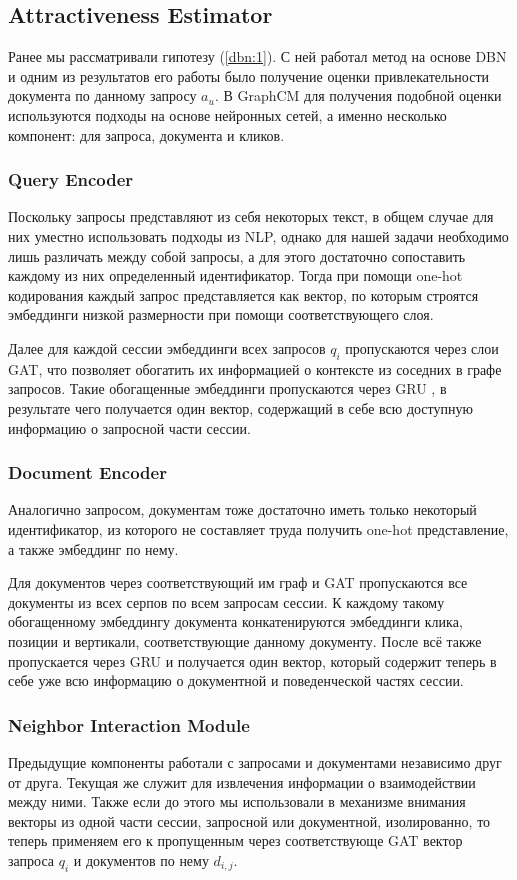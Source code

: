 \documentclass[diploma]{nanolab2015}
\begin{document}
\subsection{Attractiveness Estimator}
Ранее мы рассматривали гипотезу (\ref{dbn:1}). С ней работал метод на основе DBN и одним из результатов его работы было получение оценки привлекательности документа по данному запросу $a_u$. В GraphCM для получения подобной оценки используются подходы на основе нейронных сетей, а именно несколько компонент: для запроса, документа и кликов.

\subsubsection{Query Encoder}
Поскольку запросы представляют из себя некоторых текст, в общем случае для них уместно использовать подходы из NLP, однако для нашей задачи необходимо лишь различать между собой запросы, а для этого достаточно сопоставить каждому из них определенный идентификатор. Тогда при помощи one-hot кодирования каждый запрос представляется как вектор, по которым строятся эмбеддинги низкой размерности при помощи соответствующего слоя.

Далее для каждой сессии эмбеддинги всех запросов $q_i$ пропускаются через слои GAT, что позволяет обогатить их информацией о контексте из соседних в графе запросов. Такие обогащенные эмбеддинги пропускаются через GRU \cite{GRU}, в результате чего получается один вектор, содержащий в себе всю доступную информацию о запросной части сессии.

\subsubsection{Document Encoder}
Аналогично запросом, документам тоже достаточно иметь только некоторый идентификатор, из которого не составляет труда получить one-hot представление, а также эмбеддинг по нему.

Для документов через соответствующий им граф и GAT пропускаются все документы из всех серпов по всем запросам сессии. К каждому такому обогащенному эмбеддингу документа конкатенируются эмбеддинги клика, позиции и вертикали, соответствующие данному документу. После всё также пропускается через GRU и получается один вектор, который содержит теперь в себе уже всю информацию о документной и поведенческой частях сессии.

\subsubsection{Neighbor Interaction Module}
Предыдущие компоненты работали с запросами и документами независимо друг от друга. Текущая же служит для извлечения информации о взаимодействии между ними. Также если до этого мы использовали в механизме внимания векторы из одной части сессии, запросной или документной, изолированно, то теперь применяем его к пропущенным через соответствующе GAT вектор запроса $q_i$ и документов по нему $d_{i,j}$.
\end{document}
